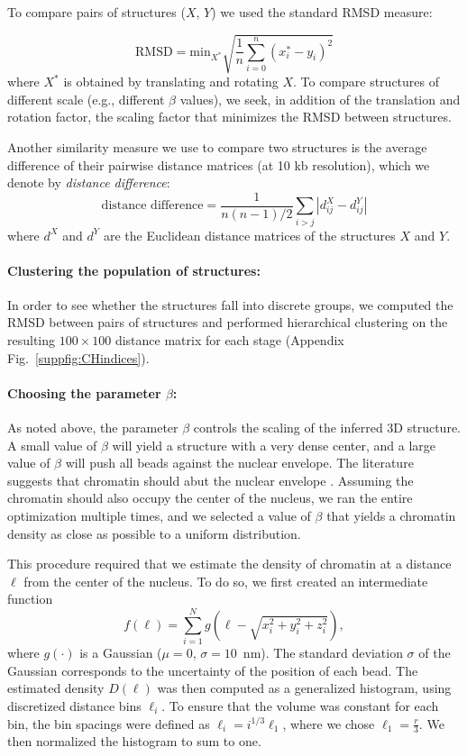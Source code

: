 To compare pairs of structures ($X$, $Y$) we used the standard RMSD measure:

\begin{equation}
\text{RMSD} = \text{min}_{X^*} \sqrt{\frac{1}{n} \sum_{i = 0}^n (x^*_i - y_i) ^ 2}
\end{equation}
where $X^*$ is obtained by translating and rotating $X$. To compare structures
of different scale (e.g., different $\beta$ values), we seek, in addition of the
translation and rotation factor, the scaling factor that minimizes the RMSD
between structures.

Another similarity measure we use to compare two structures is the average difference
of their pairwise distance matrices (at 10 kb resolution), which we denote by
\textit{distance difference}:
\begin{equation}
\text{distance difference} = \frac{1}{n(n - 1)/2} \sum_{i > j} |d^X_{ij} - d^Y_{ij}|
\end{equation}
where $d^X$ and $d^Y$ are the Euclidean distance matrices of the structures
$X$ and $Y$.

\paragraph{Clustering the population of structures:}

In order to see whether the structures fall into discrete groups, we computed
the RMSD between pairs of structures and performed hierarchical clustering on 
the resulting $100\times100$ distance matrix for each stage 
(Appendix Fig.~\ref{suppfig:CHindices}).

\paragraph{Choosing the parameter $\beta$:}
As noted above, the parameter $\beta$ controls the scaling of the inferred 3D
structure. A small value of $\beta$ will yield a structure with a very dense
center, and a large value of $\beta$ will push all beads against the nuclear
envelope. The literature suggests that chromatin should abut the nuclear
envelope \citep{weiner:3d}. Assuming the chromatin should also occupy the
center of the nucleus, we ran the entire optimization multiple times, and we
selected a value of $\beta$ that yields a chromatin density as close as
possible to a uniform distribution.

This procedure required that we estimate the density of chromatin at a
distance $\ell$ from the center of the nucleus.  To do so, we first
created an intermediate function
\[
f(\ell) = \sum_{i = 1}^N g\left(\ell - \sqrt{x_i ^2 + y_i^2 + z_i^2}\right),
\]
where $g(\cdot)$ is a Gaussian ($\mu = 0$, $\sigma = 10$~nm).  The
standard deviation $\sigma$ of the Gaussian corresponds to the
uncertainty of the position of each bead. The estimated density $D(\ell)$
was then computed as a generalized histogram, using discretized distance bins
$\ell_i$. To ensure that the volume was constant for each bin, the bin spacings
were defined as $\ell_i = i^{1 / 3} \ell_1$, where we chose $\ell_1 = \frac{r}{3}$.
We then normalized the histogram to sum to one.

